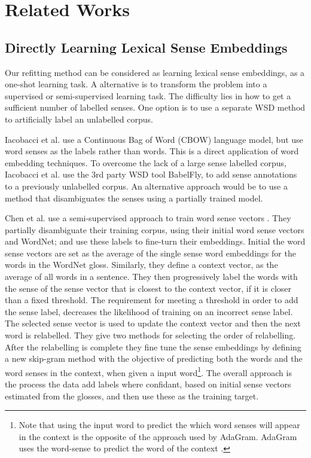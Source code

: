 \documentclass{sig-alternate}
\begin{document}
\section{Related Works} \label{relatedwords}

\subsection{Directly Learning Lexical Sense Embeddings}
Our refitting method can be considered as learning lexical sense embeddings, as a one-shot learning task. A alternative is to transform the problem into a supervised or semi-supervised learning task. The difficulty lies in how to get a sufficient number of labelled senses. One option is to use a separate WSD method to artificially label an unlabelled corpus.

Iacobacci et al. \parencite{iacobacci2015sensembed} use a Continuous Bag of Word (CBOW)  language model\parencite{mikolov2013efficient}, but use word senses as the labels rather than words. This is a direct application of word embedding techniques. To overcome the lack of a large sense labelled corpus, Iacobacci et al. use the 3rd party WSD tool BabelFly, to add sense annotations to a previously unlabelled corpus. An alternative approach would be to use a method that disambiguates the senses using a partially trained model.

Chen et al. use a semi-supervised approach to train word sense vectors \parencite{Chen2014}. They partially disambiguate their training corpus, using their initial word sense vectors and WordNet; and use these labels to fine-turn their embeddings.
Initial the word sense vectors are set as the average of the single sense word embeddings\parencite{mikolov2013efficient} for the words in the WordNet gloss.
Similarly, they define a context vector, as the average of all words in a sentence.
They then progressively label the words with the sense of the sense vector that is closest to the context vector, if it is closer than a fixed threshold.
The requirement for meeting a threshold in order to add the sense label,  decreases the likelihood of training on an incorrect sense label.
The selected sense vector is used to update the context vector and then the next word is relabelled. They give two methods for selecting the order of relabelling.
After the relabelling is complete they fine tune the sense embeddings by defining a new skip-gram method with the objective of predicting both the words and the word senses in the context, when given a input word\footnote{Note that using the input word to predict the which word senses will appear in the context is the opposite of the approach used by AdaGram. AdaGram uses the word-sense to predict the word of the context \parencite{AdaGrams}.}. The overall approach is the process the data add labels where confidant, based on initial sense vectors estimated from the glosses, and then use these as the training target.
\end{document}
